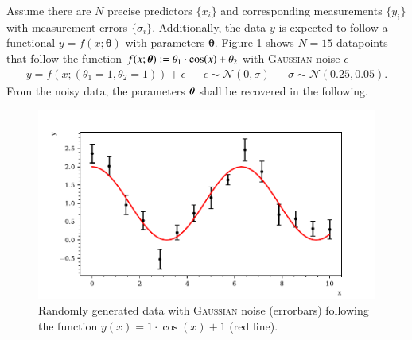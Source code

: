 Assume there are $N$ precise predictors $\{x_i\}$ and corresponding measurements $\{y_i\}$ with measurement errors $\{\sigma_i\}$. Additionally, the data $y$ is expected to follow a functional $y=f(x;\boldsymbol{\theta})$ with parameters $\boldsymbol{\theta}$. Figure \ref{fig:data} shows $N=15$ datapoints that follow the function $f(x;\boldsymbol{\theta}):=\theta_1\cdot\cos(x)+\theta_2$ with \textsc{Gaussian} noise $\epsilon$ 
\begin{align}
	y=f(x;(\theta_1=1,\theta_2=1)) +\epsilon	&& \epsilon\sim\mathcal{N}(0,\sigma) && \sigma\sim\mathcal{N}(0.25,0.05).
	\label{eq:data}
\end{align}
From the noisy data, the parameters $\boldsymbol{\theta}$ shall be recovered in the following.
\begin{figure}[htbp]
	\centering
	\includegraphics[width=\linewidth]{../bayes/noisy_model/data.pdf}
	\caption{Randomly generated data with \textsc{Gaussian} noise (errorbars) following the function $y(x)=1\cdot\cos(x)+1$ (red line).}
	\label{fig:data}
\end{figure}
